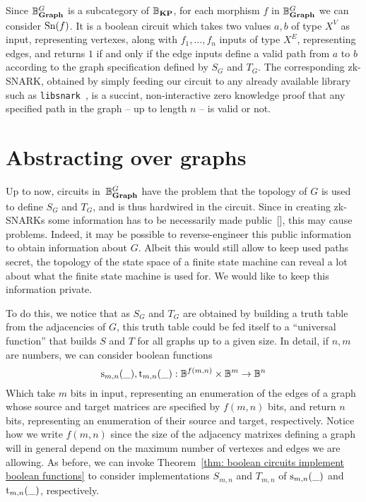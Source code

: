 \documentclass[preliminary,copyright,creativecommons,sharealike,noncommercial]{eptcs}
\begin{document}
Since $\mathbb{B}^{G}_{\textbf{Graph}}$ is a subcategory of $\mathbb{B}_\textbf{KP}$, for each
morphism $f$ in $\mathbb{B}^{G}_{\textbf{Graph}}$ we can consider $\operatorname{Sn}(f)$.
It is a boolean circuit which takes 
two values $a,b$ of type $X^V$ as input, representing vertexes, 
along with $f_1, \dots, f_n$ inputs of type $X^E$, representing 
edges, and returns $1$ if and only if the edge inputs define a valid path 
from $a$ to $b$ according to the graph specification defined by $S_G$ and $T_G$.
The corresponding zk-SNARK, obtained by simply feeding our circuit to 
any already available library such as \texttt{libsnark}~\cite{Scipr-lab2012}, is a succint,
non-interactive zero knowledge proof that any specified 
path in the graph -- up to length $n$ -- is valid or not.
%
%
%
\section{Abstracting over graphs}\label{sec: abstracting over graphs}
%
%
Up to now, circuits in~$\mathbb{B}^{G}_{\textbf{Graph}}$ have the problem that 
the topology of $G$ is used to define $S_G$ and $T_G$, and is thus 
hardwired in the circuit. Since in creating zk-SNARKs some 
information has to be necessarily made public~[], this may cause 
problems. Indeed, it may be possible to reverse-engineer this 
public information to obtain information about $G$. Albeit 
this would still allow to keep used paths secret, the topology 
of the state space of a finite state machine can reveal a lot about 
what the finite state machine is used for. We would like to keep this 
information private.

To do this, we notice that as $S_G$ and $T_G$ are obtained by building 
a truth table from the adjacencies of $G$, this truth 
table could be fed itself to a ``universal function'' that builds $S$ and $T$
for all graphs up to a given size. In detail, if $n, m$ are numbers, 
we can consider boolean functions
%
%
\begin{equation*}
  \operatorname{s}_{m,n}(\_), \operatorname{t}_{m,n}(\_): \mathbb{B}^{f(m,n)} \times \mathbb{B}^m \to \mathbb{B}^n 
\end{equation*}
%
Which take $m$ bits in input, representing an enumeration of 
the edges of a graph whose source and target matrices are 
specified by $f(m,n)$ bits, and return $n$ bits, representing
an enumeration of their source and target, respectively. Notice how we 
write $f(m,n)$ since the size of the adjacency matrixes defining 
a graph will in general depend on the maximum number of 
vertexes and edges we are allowing. As before, we can 
invoke Theorem~\ref{thm: boolean circuits implement boolean 
functions} to consider implementations $S_{m,n}$ 
and $T_{m,n}$ of $\operatorname{s}_{m,n}(\_)$ and $\operatorname{t}_{m,n}(\_)$, 
respectively.
\end{document}
